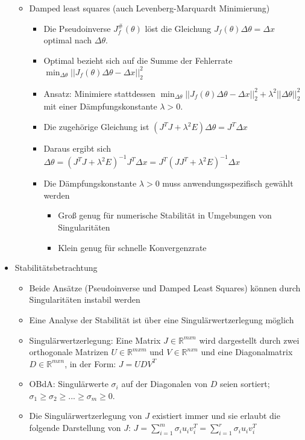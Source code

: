 \documentclass[paper=a4, fontsize=11pt]{scrartcl} %
\numberwithin{equation}{section} %
\numberwithin{figure}{section} %
\numberwithin{table}{section} %
\begin{document}
\begin{itemize}
\begin{itemize}
\item Damped least squares (auch Levenberg-Marquardt Minimierung)
\begin{itemize}
\item Die Pseudoinverse $J_f^\#(\theta)$ löst die Gleichung $J_f(\theta) \Delta \theta = \Delta x$ optimal nach $\Delta \theta$.
\item Optimal bezieht sich auf die Summe der Fehlerrate $\min_{\Delta \theta} ||J_f(\theta) \Delta \theta - \Delta x||^2_2 $
\item Ansatz: Minimiere stattdessen $\min_{\Delta \theta} ||J_f(\theta) \Delta \theta - \Delta x||^2_2 + \lambda^2 || \Delta \theta ||^2_2$ mit einer Dämpfungskonstante $\lambda > 0$.
\item Die zugehörige Gleichung ist $(J^T J + \lambda^2 E) \Delta \theta = J^T \Delta x$
\item Daraus ergibt sich $\Delta \theta = (J^T J + \lambda^2 E)^{-1} J^T \Delta x = J^T (J J^T + \lambda^2 E)^{-1} \Delta x$
\item Die Dämpfungskonstante $\lambda > 0$ muss anwendungsspezifisch gewählt werden
\begin{itemize}
\item Groß genug für numerische Stabilität in Umgebungen von Singularitäten
\item Klein genug für schnelle Konvergenzrate
\end{itemize}
\end{itemize}
\end{itemize}
\item Stabilitätsbetrachtung
\begin{itemize}
\item Beide Ansätze (Pseudoinverse und Damped Least Squares) können durch Singularitäten instabil werden
\item Eine Analyse der Stabilität ist über eine Singulärwertzerlegung möglich
\item Singulärwertzerlegung: Eine Matrix $J \in \mathbb{R}^{mxn}$ wird dargestellt durch zwei orthogonale Matrizen $U \in \mathbb{R}^{mxm}$ und $V \in \mathbb{R}^{nxn}$ und eine Diagonalmatrix $D \in \mathbb{R}^{mxn}$, in der Form: $J = UDV^T$
\item OBdA: Singulärwerte $\sigma_i$ auf der Diagonalen von $D$ seien sortiert; $\sigma_1 \ge \sigma_2 \ge ... \ge \sigma_m \ge 0$.
\item Die Singulärwertzerlegung von $J$ existiert immer und sie erlaubt die folgende Darstellung von $J$: $J = \sum_{i=1}^m \sigma_i u_i v_i^T = \sum_{i=1}^r \sigma_i u_i v_i^T$

\end{itemize}
\end{itemize}
\end{document}
